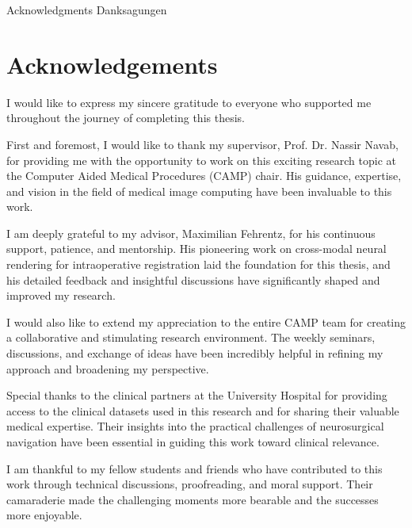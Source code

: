 \makeatletter
{}
{}
{}
\makeatother
\thispagestyle{empty}

\vspace*{20mm}

\begin{center}
\makeatletter
{}
{ Acknowledgments}
{ Danksagungen}
\makeatother
\end{center}

\vspace{10mm}

\chapter*{Acknowledgements}

I would like to express my sincere gratitude to everyone who supported me throughout the journey of completing this thesis.

First and foremost, I would like to thank my supervisor, Prof. Dr. Nassir Navab, for providing me with the opportunity to work on this exciting research topic at the Computer Aided Medical Procedures (CAMP) chair. His guidance, expertise, and vision in the field of medical image computing have been invaluable to this work.

I am deeply grateful to my advisor, Maximilian Fehrentz, for his continuous support, patience, and mentorship. His pioneering work on cross-modal neural rendering for intraoperative registration laid the foundation for this thesis, and his detailed feedback and insightful discussions have significantly shaped and improved my research.

I would also like to extend my appreciation to the entire CAMP team for creating a collaborative and stimulating research environment. The weekly seminars, discussions, and exchange of ideas have been incredibly helpful in refining my approach and broadening my perspective.

Special thanks to the clinical partners at the University Hospital for providing access to the clinical datasets used in this research and for sharing their valuable medical expertise. Their insights into the practical challenges of neurosurgical navigation have been essential in guiding this work toward clinical relevance.

I am thankful to my fellow students and friends who have contributed to this work through technical discussions, proofreading, and moral support. Their camaraderie made the challenging moments more bearable and the successes more enjoyable.


